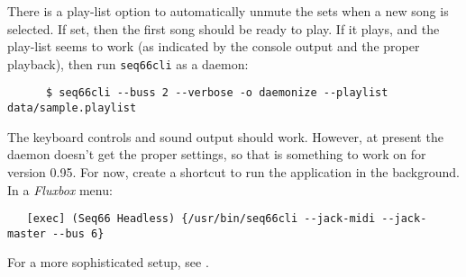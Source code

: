    There is a play-list option to automatically unmute the sets when a new song
   is selected.  If set, then the first song should be ready to play.
   If it plays, and the play-list seems to work (as indicated by the console
   output and the proper playback), then run \texttt{seq66cli} as a daemon:

   \begin{verbatim}
      $ seq66cli --buss 2 --verbose -o daemonize --playlist data/sample.playlist
   \end{verbatim}

   The keyboard controls and sound output should work.
   However, at present the daemon doesn't get the proper settings, so that is
   something to work on for version 0.95.
   For now, create a shortcut to run the application in the background.
   In a \textsl{Fluxbox} menu:

   \begin{verbatim}
   [exec] (Seq66 Headless) {/usr/bin/seq66cli --jack-midi --jack-master --bus 6}
   \end{verbatim}

   For a more sophisticated setup, see .

